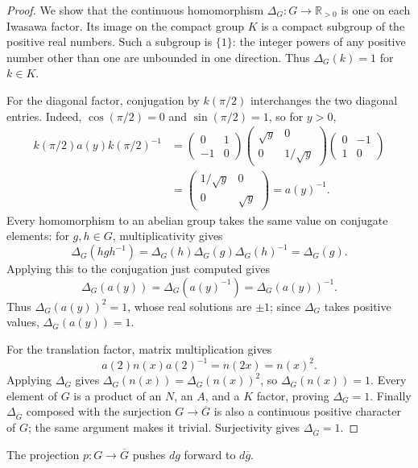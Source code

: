 \begin{proof}
We show that the continuous homomorphism $\Delta_G:G\to\mathbb R_{>0}$ is one on each Iwasawa factor. Its image on the compact group $K$ is a compact subgroup of the positive real numbers. Such a subgroup is $\{1\}$: the integer powers of any positive number other than one are unbounded in one direction. Thus $\Delta_G(k)=1$ for $k\in K$.

For the diagonal factor, conjugation by $k(\pi/2)$ interchanges the two diagonal entries. Indeed, $\cos(\pi/2)=0$ and $\sin(\pi/2)=1$, so for $y>0$,
\[
 \begin{aligned}
 k(\pi/2)a(y)k(\pi/2)^{-1}
 &=\begin{pmatrix}0&1\\-1&0\end{pmatrix}
   \begin{pmatrix}\sqrt y&0\\0&1/\sqrt y\end{pmatrix}
   \begin{pmatrix}0&-1\\1&0\end{pmatrix}\\
 &=\begin{pmatrix}1/\sqrt y&0\\0&\sqrt y\end{pmatrix}
 =a(y)^{-1}.
 \end{aligned}
\]
Every homomorphism to an abelian group takes the same value on conjugate elements: for $g,h\in G$, multiplicativity gives
\[
 \Delta_G(hgh^{-1})
 =\Delta_G(h)\Delta_G(g)\Delta_G(h)^{-1}
 =\Delta_G(g).
\]
Applying this to the conjugation just computed gives
\[
 \Delta_G(a(y))=\Delta_G(a(y)^{-1})=\Delta_G(a(y))^{-1}.
\]
Thus $\Delta_G(a(y))^2=1$, whose real solutions are $\pm1$; since $\Delta_G$ takes positive values, $\Delta_G(a(y))=1$.

For the translation factor, matrix multiplication gives
\[
 a(2)n(x)a(2)^{-1}=n(2x)=n(x)^2.
\]
Applying $\Delta_G$ gives $\Delta_G(n(x))=\Delta_G(n(x))^2$, so $\Delta_G(n(x))=1$. Every element of $G$ is a product of an $N$, an $A$, and a $K$ factor, proving $\Delta_G=1$. Finally $\Delta_{\overline G}$ composed with the surjection $G\to\overline G$ is also a continuous positive character of $G$; the same argument makes it trivial. Surjectivity gives $\Delta_{\overline G}=1$.
\end{proof}

\begin{proposition}\label{modular.haar-central-projection}
The projection $p:G\to\overline G$ pushes $dg$ forward to $d\overline g$.
\end{proposition}

